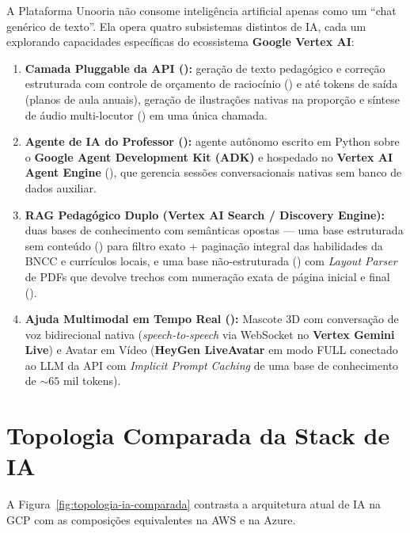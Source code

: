 A Plataforma Unooria não consome inteligência artificial apenas como um ``chat genérico de texto''. Ela opera quatro subsistemas distintos de IA, cada um explorando capacidades específicas do ecossistema \textbf{Google Vertex AI}:
\begin{enumerate}
  \item \textbf{Camada Pluggable da API ():} geração de texto pedagógico e correção estruturada com controle de orçamento de raciocínio () e até  tokens de saída (planos de aula anuais), geração de ilustrações nativas na proporção  e síntese de áudio multi-locutor () em uma única chamada.
  \item \textbf{Agente de IA do Professor ():} agente autônomo escrito em Python sobre o \textbf{Google Agent Development Kit (ADK)} e hospedado no \textbf{Vertex AI Agent Engine} (), que gerencia sessões conversacionais nativas sem banco de dados auxiliar.
  \item \textbf{RAG Pedagógico Duplo (\textbf{Vertex AI Search / Discovery Engine}):} duas bases de conhecimento com semânticas opostas --- uma base estruturada sem conteúdo () para filtro exato + paginação integral das habilidades da BNCC e currículos locais, e uma base não-estruturada () com \emph{Layout Parser} de PDFs que devolve trechos com numeração exata de página inicial e final ().
  \item \textbf{Ajuda Multimodal em Tempo Real ():} Mascote 3D com conversação de voz bidirecional nativa (\emph{speech-to-speech} via WebSocket no \textbf{Vertex Gemini Live}) e Avatar em Vídeo (\textbf{HeyGen LiveAvatar} em modo FULL conectado ao LLM da API com \emph{Implicit Prompt Caching} de uma base de conhecimento de $\sim 65$ mil tokens).
\end{enumerate}

\section{Topologia Comparada da Stack de IA}
\label{sec:topologia-ia}

A Figura~\ref{fig:topologia-ia-comparada} contrasta a arquitetura atual de IA na GCP com as composições equivalentes na AWS e na Azure.

